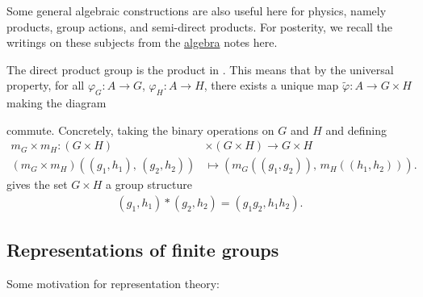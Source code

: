 \documentclass[11pt]{article}
\begin{document}
\begin{pproblem}
\end{pproblem}

Some general algebraic constructions are also useful here
for physics, namely products, group actions, and semi-direct products.
For posterity, we recall the writings on these subjects from the 
\href{https://github.com/will-lancer/notes/blob/main/Mathematics/Algebra/Algebra.pdf}{algebra} 
notes here.

The direct product group is the product in . This means that by 
the universal property, for all $\varphi_G \colon A \to G$, $\varphi_{H} \colon A \to H$,
there exists a unique map $\widetilde{\varphi} \colon A \to G \times H$
making the diagram

\begin{center}
\end{center}

\noin
commute. Concretely, taking the binary operations on $G$
and $H$ and defining 
\begin{align*}
    m_G \times m_H \colon (G \times H) & \times (G \times H) \to G \times H\\
    (m_G \times m_H)((g_1, h_1), \, (g_2, h_2)) & \mapsto (m_G((g_1, g_2)), \, m_H((h_1, h_2))).
\end{align*}
gives the set $G \times H$ a group structure
\begin{align*}
    (g_1, h_1) * (g_2, h_2) = (g_1 g_2, h_1 h_2).
\end{align*}



\subsection{Representations of finite groups}

Some motivation for representation theory:

\end{document}
